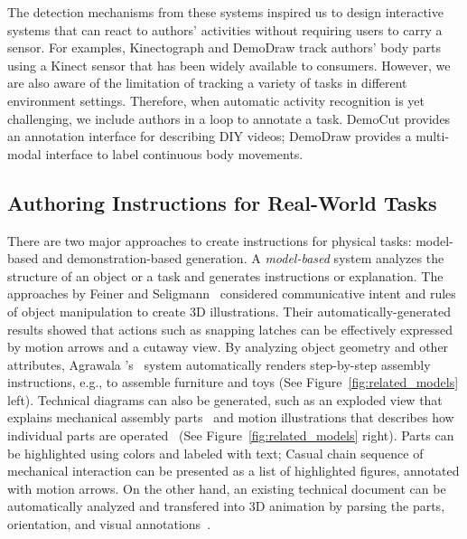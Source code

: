 The detection mechanisms from these systems inspired us to design interactive systems that can react to authors' activities without requiring users to carry  a sensor. For examples, Kinectograph and DemoDraw track authors' body parts using a Kinect sensor that has been widely available to consumers. However, we are also aware of the limitation of tracking a variety of tasks in different environment settings. Therefore, when automatic activity recognition is yet challenging, we include authors in a loop to annotate a task. DemoCut provides an annotation interface for describing DIY videos; DemoDraw provides a multi-modal interface to label continuous body movements.



\subsection{Authoring Instructions for Real-World Tasks}

There are two major approaches to create instructions for physical tasks: model-based and demonstration-based generation.
%
A \emph{model-based} system analyzes the structure of an object or a task and generates instructions or explanation.
%
The approaches by Feiner and Seligmann~\cite{feiner:1985:AEA:1299975.1300548,Seligmann:1991:AGI:127719.122732} considered communicative intent and rules of object manipulation to create 3D illustrations. Their automatically-generated results showed that actions such as snapping latches can be effectively expressed by motion arrows and a cutaway view.
%
By analyzing object geometry and other attributes, Agrawala \ea{}'s~\cite{agrawala2003designing} system automatically renders step-by-step assembly instructions, e.g., to assemble furniture and toys (See Figure~\ref{fig:related_models} left).
%
Technical diagrams can also be generated, such as an exploded view that explains mechanical assembly parts~\cite{li2008automated} and motion illustrations that describes how individual parts are operated~\cite{mitra2010illustrating} (See Figure~\ref{fig:related_models} right). Parts can be highlighted using colors and labeled with text; Casual chain sequence of mechanical interaction can be presented as a list of highlighted figures, annotated with motion arrows.
%
On the other hand, an existing technical document can be automatically analyzed and transfered into 3D animation by parsing the parts, orientation, and visual annotations~\cite{Mohr:2015:RTD:2702123.2702490}.

